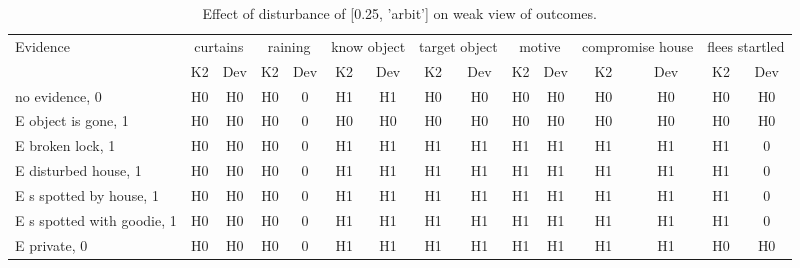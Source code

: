 \begin{table}\begin{tabular}{l|cc|cc|cc|cc|cc|cc|cc}\toprule\multirow{2}{*}{Evidence} & \multicolumn{2}{c}{curtains}& \multicolumn{2}{c}{raining}& \multicolumn{2}{c}{know object}& \multicolumn{2}{c}{target object}& \multicolumn{2}{c}{motive}& \multicolumn{2}{c}{compromise house}& \multicolumn{2}{c}{flees startled}\\& {K2} & {Dev}& {K2} & {Dev}& {K2} & {Dev}& {K2} & {Dev}& {K2} & {Dev}& {K2} & {Dev}& {K2} & {Dev}\\\midrule
no evidence, 0 & H0&H0&\cellcolor{Bittersweet}H0&\cellcolor{Bittersweet}0&H1&H1&H0&H0&H0&H0&H0&H0&H0&H0\\E object is gone, 1 & H0&H0&\cellcolor{Bittersweet}H0&\cellcolor{Bittersweet}0&H0&H0&H0&H0&H0&H0&H0&H0&H0&H0\\E broken lock, 1 & H0&H0&\cellcolor{Bittersweet}H0&\cellcolor{Bittersweet}0&H1&H1&H1&H1&H1&H1&H1&H1&\cellcolor{Bittersweet}H1&\cellcolor{Bittersweet}0\\E disturbed house, 1 & H0&H0&\cellcolor{Bittersweet}H0&\cellcolor{Bittersweet}0&H1&H1&H1&H1&H1&H1&H1&H1&\cellcolor{Bittersweet}H1&\cellcolor{Bittersweet}0\\E s spotted by house, 1 & H0&H0&\cellcolor{Bittersweet}H0&\cellcolor{Bittersweet}0&H1&H1&H1&H1&H1&H1&H1&H1&\cellcolor{Bittersweet}H1&\cellcolor{Bittersweet}0\\E s spotted with goodie, 1 & H0&H0&\cellcolor{Bittersweet}H0&\cellcolor{Bittersweet}0&H1&H1&H1&H1&H1&H1&H1&H1&\cellcolor{Bittersweet}H1&\cellcolor{Bittersweet}0\\E private, 0 & H0&H0&\cellcolor{Bittersweet}H0&\cellcolor{Bittersweet}0&H1&H1&H1&H1&H1&H1&H1&H1&H0&H0\\\bottomrule\end{tabular}\caption{Effect of disturbance of [0.25, 'arbit'] on weak view of outcomes.}\end{table}